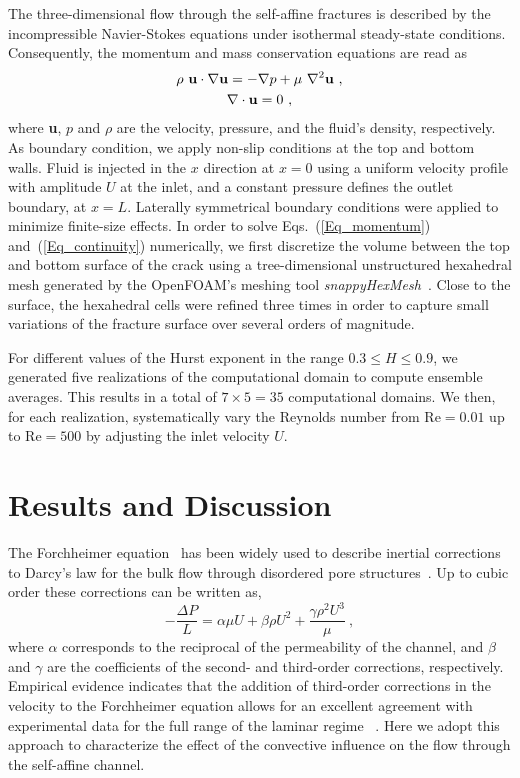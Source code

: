 \documentclass[aps,pre,
superscriptaddress,
twocolumn,
notitlepage,
10pt,]{revtex4-1}
\begin{document}
The three-dimensional flow through the self-affine fractures is described by the
incompressible Navier-Stokes equations under isothermal steady-state conditions.
Consequently, the momentum and mass conservation equations are read as
%
\begin{gather}
\rho~\mathbf{u\cdot\nabla u} = -\mathbf{\nabla} p +
\mu~\mathbf{ \nabla }^{2} \mathbf{u}~, \label{Eq_momentum} \\
{\bf{\nabla\cdot u}}=0~, \label{Eq_continuity}
\end{gather} %
where {\bf u}, $p$ and  $\rho$ are the velocity, pressure, and the fluid's
density, respectively. As boundary condition, we apply non-slip conditions at
the top and bottom walls. Fluid is injected in the $x$ direction at $x=0$ using
a uniform velocity profile with amplitude $U$ at the inlet, and a constant
pressure defines the outlet boundary, at $x=L$. Laterally symmetrical boundary
conditions were applied to minimize finite-size effects. In order to solve
Eqs.~(\ref{Eq_momentum}) and~(\ref{Eq_continuity}) numerically, we first
discretize the volume between the top and bottom surface of the crack using a
tree-dimensional unstructured hexahedral mesh generated by the OpenFOAM's
meshing tool \emph{snappyHexMesh}~\cite{OF_Weller1998}. Close to the surface,
the hexahedral cells were refined three times in order to capture small
variations of the fracture surface over several orders of magnitude.

For different values of the Hurst exponent in the range $0.3 \le H \le 0.9$, we
generated five realizations of the computational domain to compute ensemble
averages. This results in a total of $7\times 5=35$ computational domains. We
then, for each realization, systematically vary the Reynolds number from
$\mathrm{Re}=0.01$ up to $\mathrm{Re}=500$ by adjusting the inlet velocity $U$.

\section{Results and Discussion}\label{sec:results}

The Forchheimer equation~\cite{Forchheimer1901, Whitaker1996} has been widely
used to describe inertial corrections to Darcy's law for the bulk flow through
disordered pore structures~\cite{Sahimi2000,Sahimi2011,Dullien1992}. Up to cubic
order these corrections can be written as,
%
\begin{equation}
-\frac{\Delta P}{L} = \alpha \mu U + \beta \rho {U^2} + \frac{\gamma \rho^{2}
	U^{3}}{\mu}~,
\label{Eq_cubic}
\end{equation}
%
where $\alpha$ corresponds to the reciprocal of the permeability of the
channel, and $\beta$  and $\gamma$  are the coefficients of the second- and
third-order corrections, respectively. Empirical evidence indicates that
the addition of third-order corrections in the velocity to the Forchheimer
equation allows for an excellent agreement with experimental data for the
full range of the laminar regime ~\cite{Sahimi1994, Edwards1990,
	Andrade1999, Hill2001}. Here  we adopt this approach to characterize the
effect of the convective influence on the flow through the self-affine
channel.
\end{document}
